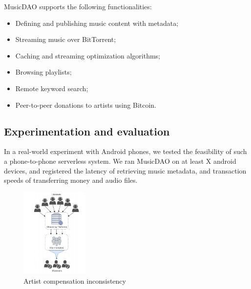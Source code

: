 MusicDAO supports the following functionalities:
\begin{itemize}
    \item Defining and publishing music content with metadata;
    \item Streaming music over BitTorrent;
    \item Caching and streaming optimization algorithms;
    \item Browsing playlists;
    \item Remote keyword search;
    \item Peer-to-peer donations to artists using Bitcoin.
\end{itemize}

\subsection{Experimentation and evaluation}
In a real-world experiment with Android phones, we tested the feasibility of such a phone-to-phone serverless system. We ran MusicDAO on at least X android devices, and registered the latency of retrieving music metadata, and transaction speeds of transferring money and audio files. 

\begin{figure}
	\includegraphics[width=0.3\textwidth]{introduction/problem-image.png}
	\caption{Artist compensation inconsistency}
\end{figure}


